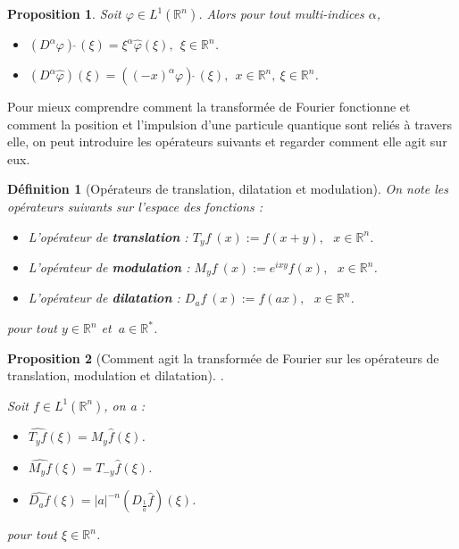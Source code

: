 \documentclass[a4paper, 12pt]{report}
\newcommand{\R}{\mathbb{R}} %
\renewcommand{\.}{\cdot} %
\theoremstyle{break}
\newtheorem{definition}{Définition}
\newtheorem{proposition}{Proposition}
\theoremstyle{remark}
\theoremstyle{proofstyle}
\begin{document}
\begin{proposition}
    Soit $\varphi \in L^1(\R^n)$. Alors pour tout multi-indices $\alpha$, \vspace{5pt}


    \begin{itemize}
        \item $(D^\alpha \varphi) \hat{~} (\xi) = \xi ^\alpha \hat{\varphi} (\xi) ,~~ \xi \in \R^n$.
        \item $(D^\alpha \hat{\varphi}) (\xi) = ((-x)^\alpha \varphi) \hat{~} (\xi),~~ x \in \R^n,~ \xi \in \R^n$.
    \end{itemize}
\end{proposition}

Pour mieux comprendre comment la transformée de Fourier fonctionne et comment la position et l'impulsion d'une particule quantique sont reliés à travers elle, on peut introduire les opérateurs suivants et regarder comment elle agit sur eux.

\begin{definition}[Opérateurs de translation, dilatation et modulation]
    On note les opérateurs suivants sur l'espace des fonctions : \vspace{5pt}
    \begin{itemize}
        \item L'opérateur de \textbf{translation} : $T_yf~(x) := f(x+y),~~~x \in \mathbb{R}^n$.
        \item L'opérateur de \textbf{modulation} : $M_yf~(x) := e^{ixy}f(x),~~~x \in \mathbb{R}^n$.
        \item L'opérateur de \textbf{dilatation} : $D_af~(x) := f(ax),~~~x \in \mathbb{R}^n$.
    \end{itemize}
    pour tout $y \in \mathbb{R}^n$ et $~a \in \mathbb{R}^*$.
\end{definition}

\begin{proposition}[Comment agit la transformée de Fourier sur les opérateurs de translation, modulation et dilatation]
    .

    \vspace{5pt}
    Soit $f \in L^1(\mathbb{R}^n)$, on a : %
    \begin{itemize}
        \item $\widehat{T_yf}(\xi) = M_y\hat{f}(\xi)$.
        \item $\widehat{M_yf}(\xi) = T_{-y}\hat{f}(\xi)$.
        \item $\widehat{D_af}(\xi) = |a|^{-n}(D_{\frac{1}{a}} \hat{f})(\xi)$.
    \end{itemize}
    pour tout $\xi \in \mathbb{R}^n$.
\end{proposition}
\end{document}
